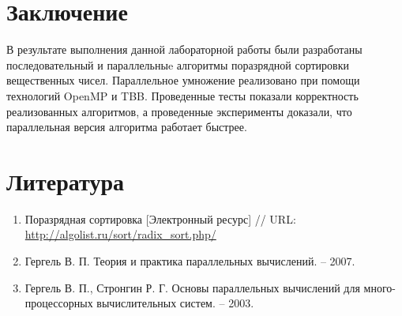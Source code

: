 \documentclass{report}
\begin{document}
\newpage

\newpage

\section*{Заключение}
В результате выполнения   данной лабораторной работы были разработаны последовательный и параллельныe алгоритмы поразрядной сортировки вещественных чисел. Параллельное умножение реализовано при помощи технологий OpenMP и TBB. Проведенные тесты показали корректность реализованных алгоритмов, а проведенные эксперименты доказали, что параллельная версия алгоритма работает быстрее.

\newpage

\section*{Литература}
\begin{enumerate}
\item Поразрядная сортировка [Электронный ресурс] // URL: \url{http://algolist.ru/sort/radix_sort.php/}
\item Гергель В. П. Теория и практика параллельных вычислений. – 2007.
\item  Гергель В. П., Стронгин Р. Г. Основы параллельных вычислений для много-
процессорных вычислительных систем. – 2003.
\end{enumerate} 
\newpage

\end{document}
